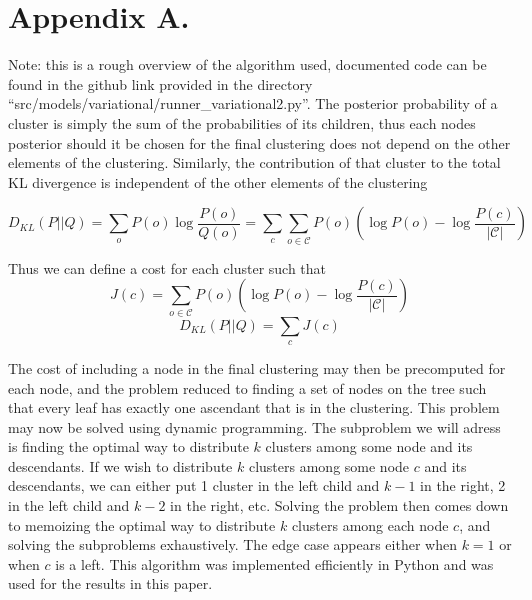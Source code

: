 \documentclass[11pt,letterpaper]{article}
\newcommand{\mc}[1]{\mathcal{#1}}
\begin{document}
\clearpage
\section*{Appendix A.}
Note: this is a rough overview of the algorithm used, documented code can be found in the github link provided in the directory 
``src/models/variational/runner\_variational2.py''. \newline
The posterior probability of a cluster is simply the sum of the probabilities of its children, thus each nodes posterior should it be chosen for the final clustering does not depend on the other elements of the clustering. Similarly, the contribution of that cluster to the total KL divergence is independent of the other elements of the clustering

\begin{equation}
D_{KL}(P||Q) = \sum_o P(o) \log \frac{P(o)}{Q(o)} = 
			\sum_c \sum_{o \in \mc{C}} P(o) (\log P(o) - \log \frac{P(c)}{|\mc{C}|})
\end{equation}

Thus we can define a cost for each cluster such that 
\begin{equation}
J(c) = \sum_{o \in \mc{C}} P(o) (\log P(o) - \log \frac{P(c)}{|\mc{C}|})
\end{equation}
\[
D_{KL}(P||Q) = \sum_c J(c)
\]

The cost of including a node in the final clustering may then be precomputed for each node, and the problem reduced to finding a set of nodes on the tree such that every leaf has exactly one ascendant that is in the clustering. This problem may now be solved using dynamic programming. The subproblem we will adress is finding the optimal way to distribute $k$ clusters among some node and its descendants. If we wish to distribute $k$ clusters among some node $c$ and its descendants, we can either put 1 cluster in the left child and $k-1$ in the right, 2 in the left child and $k-2$ in the right, etc. Solving the problem then comes down to memoizing the optimal way to distribute $k$ clusters among each node $c$, and solving the subproblems exhaustively. The edge case appears either when $k = 1$ or when $c$ is a left. This algorithm was implemented efficiently in Python and was used for the results in this paper.



\vskip 0.2in

\clearpage

\setlength{\bibleftmargin}{.125in}
\setlength{\bibindent}{-\bibleftmargin}

\end{document}

